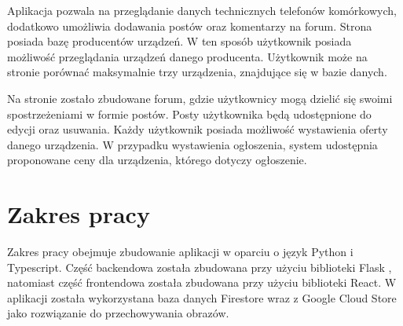 Aplikacja pozwala na przeglądanie danych technicznych telefonów komórkowych, dodatkowo umożliwia dodawania postów oraz komentarzy na forum. Strona posiada bazę producentów urządzeń. W ten sposób użytkownik posiada możliwość przeglądania urządzeń danego producenta. Użytkownik może na stronie porównać maksymalnie trzy urządzenia, znajdujące się w bazie danych.

Na stronie zostało zbudowane forum, gdzie użytkownicy mogą dzielić się swoimi spostrzeżeniami w formie postów. Posty użytkownika będą udostępnione do edycji oraz usuwania. Każdy użytkownik posiada możliwość wystawienia oferty danego urządzenia. W przypadku wystawienia ogłoszenia, system udostępnia proponowane ceny dla urządzenia, którego dotyczy ogłoszenie.

\section{Zakres pracy}
Zakres pracy obejmuje zbudowanie aplikacji w oparciu o język Python \cite{python} i Typescript\cite*{TypeScript}. Część backendowa została zbudowana przy użyciu biblioteki Flask \cite{flask}, natomiast część frontendowa została zbudowana przy użyciu biblioteki React. W aplikacji została wykorzystana baza danych Firestore wraz z Google Cloud Store jako rozwiązanie do przechowywania obrazów. 

